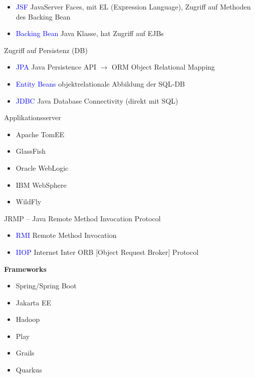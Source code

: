 \begin{itemize}
    \item \textcolor{blue}{JSF} JavaServer Faces, mit EL (Expression Language), Zugriff auf Methoden des Backing Bean
    \item \textcolor{blue}{Backing Bean} Java Klasse, hat Zugriff auf EJBs
\end{itemize}
\vspace{10pt}
Zugriff auf Persistenz (DB)

\begin{itemize}
    \item \textcolor{blue}{JPA} Java Persistence API $\rightarrow$ ORM Object Relational Mapping
    \item \textcolor{blue}{Entity Beans} objektrelationale Abbildung der SQL-DB
    \item \textcolor{blue}{JDBC} Java Database Connectivity (direkt mit SQL)
\end{itemize}
\vspace{10pt}
Applikationsserver

\begin{itemize}
    \item Apache TomEE
    \item GlassFish
    \item Oracle WebLogic
    \item IBM WebSphere
    \item WildFly
\end{itemize}
\vspace{10pt}
JRMP – Java Remote Method Invocation Protocol

\begin{itemize}
    \item \textcolor{blue}{RMI} Remote Method Invocation
    \item \textcolor{blue}{IIOP} Internet Inter ORB [Object Request Broker] Protocol
\end{itemize}

\textbf{Frameworks}

\begin{itemize}
    \item Spring/Spring Boot
    \item Jakarta EE
    \item Hadoop
    \item Play
    \item Grails
    \item Quarkus
\end{itemize}

